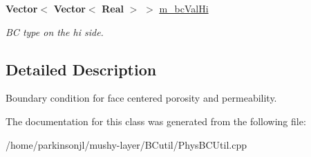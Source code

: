 \begin{DoxyCompactItemize}
\mbox{\label{class_basic_porosity_permeability_face_b_c_function_ae15db449a406cd36b5b2306eb5ef8aeb}} 
\textbf{ Vector}$<$ \textbf{ Vector}$<$ \textbf{ Real} $>$ $>$ \hyperlink{class_basic_porosity_permeability_face_b_c_function_ae15db449a406cd36b5b2306eb5ef8aeb}{m\+\_\+bc\+Val\+Hi}
\begin{DoxyCompactList}\small\item\em BC type on the hi side. \end{DoxyCompactList}\end{DoxyCompactItemize}


\subsection{Detailed Description}
Boundary condition for face centered porosity and permeability. 

The documentation for this class was generated from the following file\+:\begin{DoxyCompactItemize}
\item 
/home/parkinsonjl/mushy-\/layer/\+B\+Cutil/Phys\+B\+C\+Util.\+cpp\end{DoxyCompactItemize}
